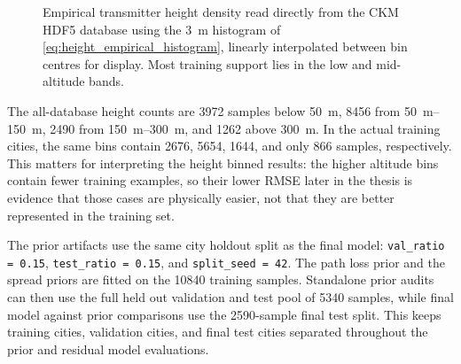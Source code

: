 \begin{figure}[ht]
  \centering
  \caption{Empirical transmitter height density read directly from the CKM
  HDF5 database using the \SI{3}{m} histogram of
  \eqref{eq:height_empirical_histogram}, linearly interpolated between bin
  centres for display. Most training support lies in the low and mid-altitude
  bands.}
  \label{fig:height_density}
\end{figure}

The all-database height counts are 3972 samples below \SI{50}{m}, 8456 from
\SIrange{50}{150}{m}, 2490 from \SIrange{150}{300}{m}, and 1262 above
\SI{300}{m}. In the actual training cities, the same bins contain 2676, 5654,
1644, and only 866 samples, respectively. This matters for interpreting the
height binned results: the higher altitude bins contain fewer training
examples, so their lower RMSE later in the thesis is evidence that those cases
are physically easier, not that they are better represented in the training
set.

The prior artifacts use the same city holdout split as the final model:
\texttt{val\_ratio = 0.15}, \texttt{test\_ratio = 0.15}, and
\texttt{split\_seed = 42}. The path loss prior and the spread priors are
fitted on the 10840 training samples. Standalone prior audits can then use
the full held out validation and test pool of 5340 samples, while final
model against prior comparisons use the 2590-sample final test split. This keeps
training cities, validation cities, and final test cities separated throughout
the prior and residual model evaluations.

